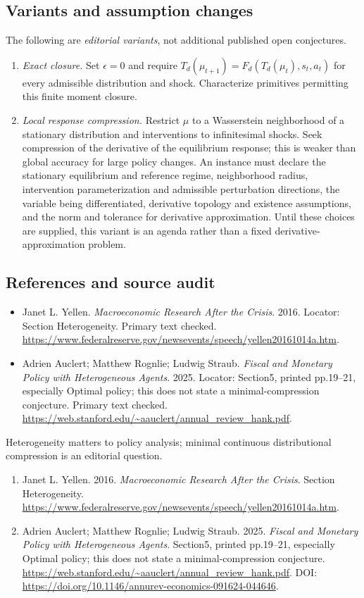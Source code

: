 \documentclass[11pt,a4paper]{article}
\begin{document}
\subsection*{Variants and assumption changes}
The following are \emph{editorial variants}, not additional published open conjectures.
\begin{enumerate}
\item \emph{Exact closure.} Set \(\epsilon=0\) and require \(T_d(\mu_{t+1})=F_d(T_d(\mu_t),s_t,a_t)\) for every admissible distribution and shock. Characterize primitives permitting this finite moment closure.
\item \emph{Local response compression.} Restrict \(\mu\) to a Wasserstein neighborhood of a stationary distribution and interventions to infinitesimal shocks. Seek compression of the derivative of the equilibrium response; this is weaker than global accuracy for large policy changes. An instance must declare the stationary equilibrium and reference regime, neighborhood radius, intervention parameterization and admissible perturbation directions, the variable being differentiated, derivative topology and existence assumptions, and the norm and tolerance for derivative approximation. Until these choices are supplied, this variant is an agenda rather than a fixed derivative-approximation problem.
\end{enumerate}
\subsection*{References and source audit}
\begin{itemize}
\item Janet L. Yellen. \emph{Macroeconomic Research After the Crisis}. 2016. Locator: Section Heterogeneity. Primary text checked. \url{https://www.federalreserve.gov/newsevents/speech/yellen20161014a.htm}.
\item Adrien Auclert; Matthew Rognlie; Ludwig Straub. \emph{Fiscal and Monetary Policy with Heterogeneous Agents}. 2025. Locator: Section5, printed pp.19--21, especially Optimal policy; this does not state a minimal-compression conjecture. Primary text checked. \url{https://web.stanford.edu/~aauclert/annual_review_hank.pdf}.
\end{itemize}
Heterogeneity matters to policy analysis; minimal continuous distributional compression is an editorial question.
\begin{enumerate}\raggedright
\item\hypertarget{definitions:source:30007515:1}{} Janet L. Yellen. 2016. \emph{Macroeconomic Research After the Crisis}. Section Heterogeneity.
\url{https://www.federalreserve.gov/newsevents/speech/yellen20161014a.htm}.
\item\hypertarget{definitions:source:30007515:2}{} Adrien Auclert; Matthew Rognlie; Ludwig Straub. 2025. \emph{Fiscal and Monetary Policy with Heterogeneous Agents}. Section5, printed pp.19--21, especially Optimal policy; this does not state a minimal-compression conjecture.
\url{https://web.stanford.edu/~aauclert/annual_review_hank.pdf}.
DOI: \url{https://doi.org/10.1146/annurev-economics-091624-044646}.
\end{enumerate}
\end{document}
